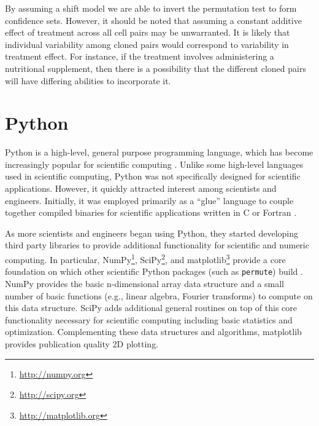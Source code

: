 \begin{example}[continues=exa:cont]
By assuming a shift model we are able to invert the permutation test to form
confidence sets.  However, it should be noted that assuming a constant additive
effect of treatment across all cell pairs may be unwarranted. It is likely
that individual variability among cloned pairs would correspond to variability
in treatment effect.  For instance, if the treatment involves administering a
nutritional supplement, then there is a possibility that the different cloned
pairs will have differing abilities to incorporate it.


\end{example}

\section{Python}

Python is a high-level, general purpose programming language, which has become
increasingly popular for scientific computing \cite{millman2011python,
Perez2011}. Unlike some high-level languages used in scientific computing,
Python was not specifically designed for scientific applications.  However, it
quickly attracted interest among scientists and engineers.  Initially, it was
employed primarily as a ``glue'' language to couple together compiled binaries
for scientific applications written in C or Fortran \cite{dubois2007guest}.

As more scientists and engineers began using Python, they started developing
third party libraries to provide additional functionality for scientific and
numeric computing.  In particular, NumPy\footnote{\url{http://numpy.org}},
SciPy\footnote{\url{http://scipy.org}}, and
matplotlib\footnote{\url{http://matplotlib.org}} provide a core foundation on
which other scientific Python packages (such as \texttt{permute}) build 
\cite{oliphant2007python, van2011numpy, hunter2007matplotlib}. NumPy
provides the basic n-dimensional array data structure and a small number of
basic functions (e.g., linear algebra, Fourier transforms) to compute on this data
structure.  SciPy adds additional general routines on top of this core
functionality necessary for scientific computing including basic statistics and
optimization.  Complementing these data structures and algorithms, matplotlib
provides publication quality 2D plotting.  

